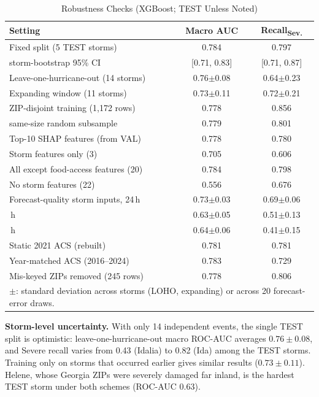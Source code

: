 \documentclass[conference]{IEEEtran}
\renewcommand{\_}{\origunderscore\allowbreak}
\begin{document}
\begin{table}[htbp]
\caption{Robustness Checks (XGBoost; TEST Unless Noted)}
\label{tab:robust}
\centering
\small
\setlength{\tabcolsep}{3pt}
\begin{tabular}{lcc}
\toprule
\textbf{Setting} & \textbf{Macro AUC} & \textbf{Recall\textsubscript{Sev.}} \\
\midrule
Fixed split (5 TEST storms)                & 0.784 & 0.797 \\
\quad storm-bootstrap 95\% CI              & [0.71, 0.83] & [0.71, 0.87] \\
Leave-one-hurricane-out (14 storms)        & 0.76$\pm$0.08 & 0.64$\pm$0.23 \\
Expanding window (11 storms)               & 0.73$\pm$0.11 & 0.72$\pm$0.21 \\
\midrule
ZIP-disjoint training (1,172 rows)         & 0.778 & 0.856 \\
\quad same-size random subsample           & 0.779 & 0.801 \\
\midrule
Top-10 SHAP features (from VAL)            & 0.778 & 0.780 \\
Storm features only (3)                    & 0.705 & 0.606 \\
All except food-access features (20)       & 0.784 & 0.798 \\
No storm features (22)                     & 0.556 & 0.676 \\
\midrule
Forecast-quality storm inputs, 24\,h       & 0.73$\pm$0.03 & 0.69$\pm$0.06 \\
\quad 48\,h                                & 0.63$\pm$0.05 & 0.51$\pm$0.13 \\
\quad 72\,h                                & 0.64$\pm$0.06 & 0.41$\pm$0.15 \\
\midrule
Static 2021 ACS (rebuilt)                  & 0.781 & 0.781 \\
Year-matched ACS (2016--2024)              & 0.783 & 0.729 \\
Mis-keyed ZIPs removed (245 rows)          & 0.778 & 0.806 \\
\bottomrule
\multicolumn{3}{p{0.94\columnwidth}}{\footnotesize $\pm$: standard
deviation across storms (LOHO, expanding) or across 20 forecast-error
draws.}\\
\end{tabular}
\end{table}

\textbf{Storm-level uncertainty.} With only 14 independent
events, the single TEST split is optimistic: leave-one-hurricane-out
macro ROC-AUC averages $0.76\pm0.08$, and Severe recall varies
from 0.43 (Idalia) to 0.82 (Ida) among the TEST storms. Training
only on storms that occurred earlier gives similar results
($0.73\pm0.11$). Helene, whose Georgia ZIPs were severely damaged
far inland, is the hardest TEST storm under both schemes (ROC-AUC
0.63).
\end{document}
